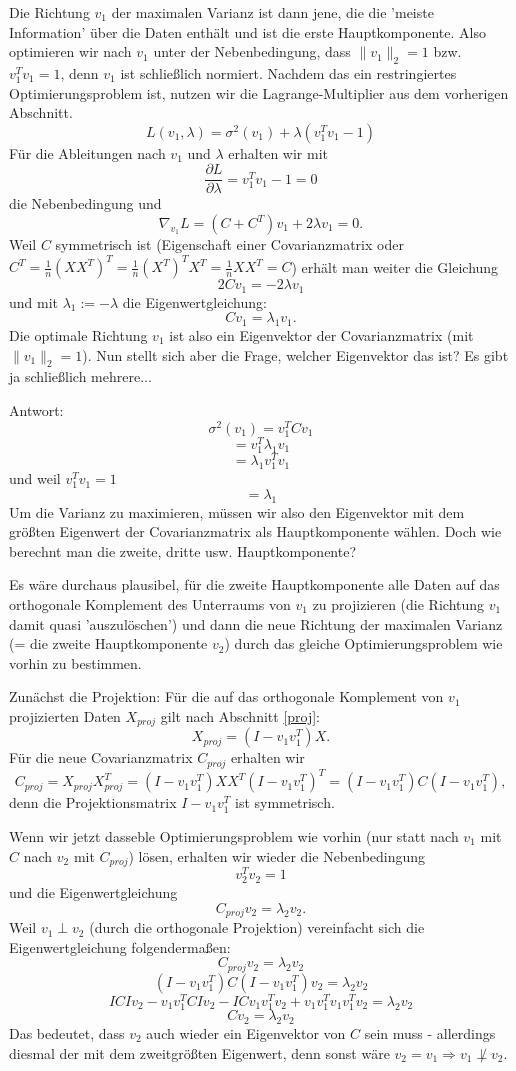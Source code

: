 \documentclass{article}
\begin{document}
Die Richtung \(v_1\) der maximalen Varianz ist dann jene, die die 'meiste Information' über die Daten enthält und ist die erste Hauptkomponente. Also optimieren wir nach \(v_1\) unter der Nebenbedingung, dass \(\|v_1\|_2=1\) bzw. \(v_1^Tv_1=1\), denn \(v_1\) ist schließlich normiert. Nachdem das ein restringiertes Optimierungsproblem ist, nutzen wir die Lagrange-Multiplier aus dem vorherigen Abschnitt.\[
L(v_1,\lambda)=\sigma^2(v_1)+\lambda(v_1^Tv_1-1)
\]Für die Ableitungen nach \(v_1\) und \(\lambda\) erhalten wir mit\[
\frac{\partial L}{\partial \lambda}=v_1^Tv_1-1=0
\]die Nebenbedingung und \[
\nabla_{v_1}L=(C+C^T)v_1+2\lambda v_1=0.
\]Weil \(C\) symmetrisch ist (Eigenschaft einer Covarianzmatrix oder \(C^T=\frac1n(XX^T)^T=\frac1n(X^T)^TX^T=\frac1nXX^T=C\)) erhält man weiter die Gleichung\[
2Cv_1=-2\lambda v_1
\]und mit \(\lambda_1:=-\lambda\) die Eigenwertgleichung:\[
Cv_1=\lambda_1v_1.
\]Die optimale Richtung \(v_1\) ist also ein Eigenvektor der Covarianzmatrix (mit \(\|v_1\|_2=1\)). Nun stellt sich aber die Frage, welcher Eigenvektor das ist? Es gibt ja schließlich mehrere...

Antwort:\[
\sigma^2(v_1)=v_1^TCv_1
\]\[
=v_1^T\lambda_1v_1
\]\[
=\lambda_1v_1^Tv_1
\]
und weil \(v_1^Tv_1=1\)
\[
=\lambda_1
\]
Um die Varianz zu maximieren, müssen wir also den Eigenvektor mit dem größten Eigenwert der Covarianzmatrix als Hauptkomponente wählen. Doch wie berechnt man die zweite, dritte usw. Hauptkomponente?

Es wäre durchaus plausibel, für die zweite Hauptkomponente alle Daten auf das orthogonale Komplement des Unterraums von \(v_1\) zu projizieren (die Richtung \(v_1\) damit quasi 'auszulöschen') und dann die neue Richtung der maximalen Varianz (= die zweite Hauptkomponente \(v_2\)) durch das gleiche Optimierungsproblem wie vorhin zu bestimmen.

Zunächst die Projektion: Für die auf das orthogonale Komplement von \(v_1\) projizierten Daten \(X_{proj}\) gilt nach Abschnitt \ref{proj}:\[
X_{proj}=(I-v_1v_1^T)X.
\] Für die neue Covarianzmatrix \(C_{proj}\) erhalten wir\[
C_{proj}=X_{proj}X_{proj}^T=(I-v_1v_1^T)XX^T(I-v_1v_1^T)^T=(I-v_1v_1^T)C(I-v_1v_1^T),
\]denn die Projektionsmatrix \(I-v_1v_1^T\) ist symmetrisch.

Wenn wir jetzt dasseble Optimierungsproblem wie vorhin (nur statt nach \(v_1\) mit \(C\) nach \(v_2\) mit \(C_{proj}\)) lösen, erhalten wir wieder die Nebenbedingung
\[
v_2^Tv_2=1 
\]und die Eigenwertgleichung\[
    C_{proj}v_2=\lambda_2v_2.
\]Weil \(v_1\perp v_2\) (durch die orthogonale Projektion) vereinfacht sich die Eigenwertgleichung folgendermaßen:\[
C_{proj}v_2=\lambda_2v_2
\]\[
(I-v_1v_1^T)C(I-v_1v_1^T)v_2=\lambda_2v_2
\]\[
ICIv_2-v_1v_1^TCIv_2-ICv_1v_1^Tv_2+v_1v_1^Tv_1v_1^Tv_2=\lambda_2v_2
\]\[
Cv_2=\lambda_2v_2
\]
Das bedeutet, dass \(v_2\) auch wieder ein Eigenvektor von \(C\) sein muss - allerdings diesmal der mit dem zweitgrößten Eigenwert, denn sonst wäre \(v_2=v_1\Rightarrow v_1\not\perp v_2\).
\end{document}
